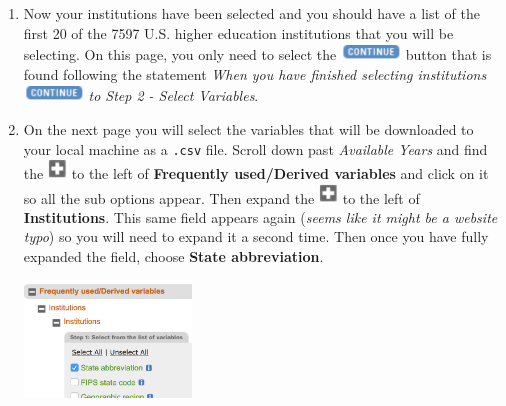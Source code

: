 \documentclass{article}
\newcommand{\code}[1]{\texttt{#1}}
\begin{document}
{\begin{enumerate}[leftmargin=15mm]
\item Now your institutions have been selected and you should have a list of the first 20 of the 7597 U.S. higher education institutions that you will be selecting.  On this page, you only need to select the \includegraphics[width=0.125\textwidth]{continue.png} button that is found following the statement \textit{When you have finished selecting institutions} \includegraphics[width=0.125\textwidth]{continue.png} \textit{to Step 2 - Select Variables}.

\item On the next page you will select the variables that will be downloaded to your local machine as a \code{.csv} file.  Scroll down past \textit{Available Years} and find the \includegraphics[width=0.04\textwidth]{plus.png} to the left of \textbf{Frequently used/Derived variables} and click on it so all the sub options appear.  Then expand the \includegraphics[width=0.04\textwidth]{plus.png} to the left of \textbf{Institutions}.  This same field appears again (\textit{seems like it might be a website typo}) so you will need to expand it a second time.  Then once you have fully expanded the field, choose \textbf{State abbreviation}. \begin{flushright}\includegraphics[width=0.35\textwidth]{state.png} \end{flushright}


\end{enumerate}}
\end{document}

